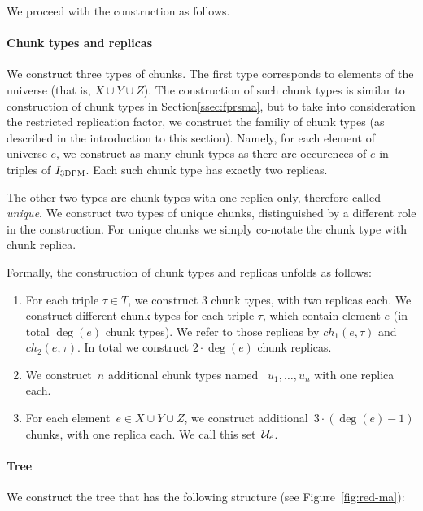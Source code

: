 We proceed with the construction as follows.

\paragraph{Chunk types and replicas}

We construct three types of chunks.
The first type corresponds to elements of the universe (that is, $X\cup Y\cup Z$).
The construction of such chunk types is similar to construction of chunk types in Section\ref{ssec:fprsma}, but to take into consideration the restricted replication factor, we construct the familiy of chunk types (as described in the introduction to this section).
Namely, for each element of universe $e$, we construct as many chunk types as there are occurences of $e$ in triples of $I_{\textsc{3DPM}}$.
Each such chunk type has exactly two replicas.

The other two types are chunk types with one replica only, therefore called \emph{unique}.
We construct two types of unique chunks, distinguished by a different role in the construction.
For unique chunks we simply co-notate the chunk type with chunk replica.

Formally, the construction of chunk types and replicas unfolds as follows:
\begin{enumerate}
  \item For each triple $\tau \in T$, we construct $3$ chunk types, with two replicas each.
  We construct different chunk types for each triple $\tau$, which contain element $e$ (in total $\deg(e)$ chunk types).
  We refer to those replicas by $ch_1(e, \tau)$ and $ch_2(e, \tau)$.
  In total we construct $2\cdot \deg(e)$ chunk replicas.
  \item We construct~$n$ additional chunk types named
  ~$u_1, \ldots, u_n$ with one replica each.
  \item For each element~$e\in X\cup Y\cup Z$,
  we construct additional~$3\cdot(\deg(e) - 1)$ chunks, with one replica each.
  We call this set~${\mathcal{U}_e}$.
\end{enumerate}

\paragraph{Tree}

We construct the tree that has the following structure (see Figure~\ref{fig:red-ma}):

